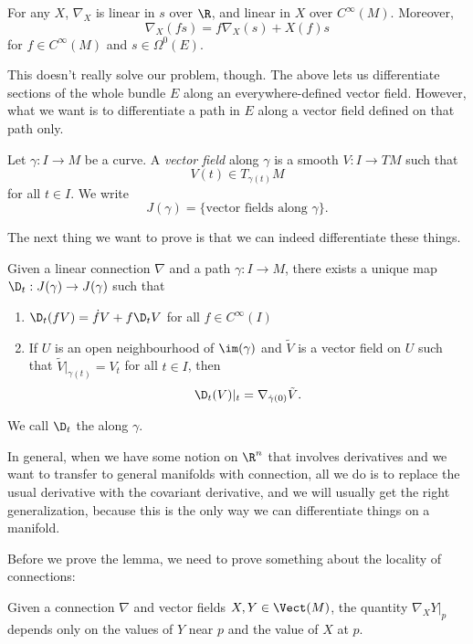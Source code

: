 \documentclass[a4paper]{article}
\begin{document}
\begin{prop}
  For any $X$, $\nabla_X$ is linear in $s$ over $\R$, and linear in $X$ over $C^\infty(M)$. Moreover,
  \[
    \nabla_X(fs) = f \nabla_X(s) + X(f) s
  \]
  for $f \in C^\infty(M)$ and $s \in \Omega^0(E)$.
\end{prop}

This doesn't really solve our problem, though. The above lets us differentiate sections of the whole bundle $E$ along an everywhere-defined vector field. However, what we want is to differentiate a path in $E$ along a vector field defined on that path only.

\begin{defi}
  Let $\gamma: I \to M$ be a curve. A \emph{vector field} along $\gamma$ is a smooth $V: I \to TM$ such that
  \[
    V(t) \in T_{\gamma(t)} M
  \]
  for all $t \in I$. We write
  \[
    J(\gamma) = \{\text{vector fields along $\gamma$}\}.
  \]
\end{defi}
The next thing we want to prove is that we can indeed differentiate these things.

\begin{lemma}
  Given a linear connection $\nabla$ and a path $\gamma: I \to M$, there exists a unique map $\D_t: J(\gamma) \to J(\gamma)$ such that
  \begin{enumerate}
    \item $\D_t(fV) = \dot{f} V + f \D_t V$ for all $f \in C^\infty(I)$
    \item If $U$ is an open neighbourhood of $\im(\gamma)$ and $\tilde{V}$ is a vector field on $U$ such that $\tilde{V}|_{\gamma(t)} = V_t$ for all $t \in I$, then
      \[
        \D_t(V)|_t = \nabla_{\dot{\gamma}(0)} \tilde{V}.
      \]
  \end{enumerate}
  We call $\D_t$ the  along $\gamma$.
\end{lemma}
In general, when we have some notion on $\R^n$ that involves derivatives and we want to transfer to general manifolds with connection, all we do is to replace the usual derivative with the covariant derivative, and we will usually get the right generalization, because this is the only way we can differentiate things on a manifold.

Before we prove the lemma, we need to prove something about the locality of connections:
\begin{lemma}
  Given a connection $\nabla$ and vector fields $X, Y \in \Vect(M)$, the quantity $\nabla_X Y|_p$ depends only on the values of $Y$ near $p$ and the value of $X$ at $p$.
\end{lemma}
\end{document}
